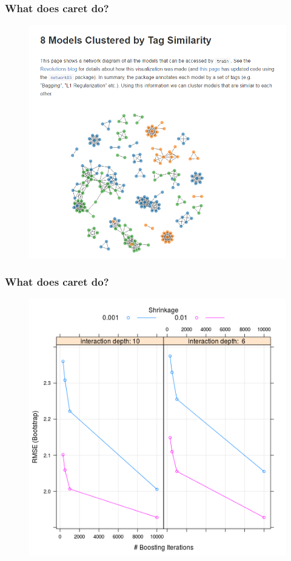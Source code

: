 \documentclass{beamer}
\begin{document}
\begin{frame}
\frametitle{What does caret do?}
\begin{figure}
    \includegraphics[height = 0.8\textheight]{Capture}
\end{figure} 
\end{frame} 



\begin{frame}
\frametitle{What does caret do?}
\begin{figure}
    \includegraphics[height = 0.8\textheight]{gbm2opt}
\end{figure} 
\end{frame} 
\end{document}
